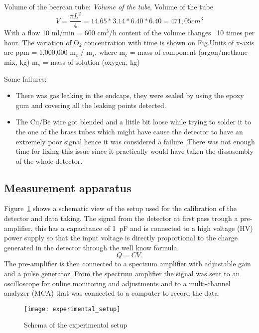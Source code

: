 Volume of the beercan tube:
\emph{Volume of the tube}, Volume of the tube
\begin{equation}
  \label{eq:tube_volume}
  V=\frac{\pi L^2}{4} =14.65*3.14*6.40*6.40=471,05 cm^3
\end{equation}
With a flow 10 ml/min = 600 cm$^3$/h content of the volume changes ~10 times per
hour.  The variation of O$_{2}$ concentration with time is shown on Fig.Units of
x-axis are ppm = 1,000,000 m$_{c}$ / m$_{s}$, where m$_{c}$ = mass of component
(argon/methane mix, kg) m$_{s}$ = mass of solution (oxygen, kg)

Some failures:
\begin{itemize}
\item There was gas leaking in the endcaps, they were sealed by using the epoxy
  gum and covering all the leaking points detected.
  \item The Cu/Be wire got blended and a little bit loose while trying to solder
    it to the one of the brass tubes which might have cause the detector to have
    an extremely poor signal hence it was considered a failure. There was not
    enough time for fixing this issue since it practically would have taken the
    dissasembly of the whole detector.
\end{itemize}

\subsection{Measurement apparatus}
\label{sec:meas-appar}
Figure~\ref{fig:exp_setup} shows a schematic view of the setup used for the
calibration of the detector and data taking. The signal from the detector at
first pass trough a pre-amplifier, this has a capacitance of 1~pF and is
connected to a high voltage (HV) power supply so that the input voltage is
directly proportional to the charge generated in the detector through the well
know formula
\begin{equation}
  \label{eq:capacitance}
  Q = CV.
\end{equation}
The pre-amplifier is then connected to a spectrum amplifier with adjustable gain
and a pulse generator. From the spectrum amplifier the signal was sent to an
oscilloscope for online monitoring and adjustments and to a multi-channel
analyzer (MCA) that was connected to a computer to record the data.
\begin{figure}[!h]
  \centering
  \texttt{[image: experimental\_setup]}
  \caption{Schema of the experimental setup}
  \label{fig:exp_setup}
\end{figure}

